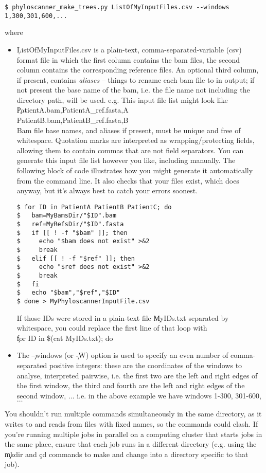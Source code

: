 \begin{verbatim}
$ phyloscanner_make_trees.py ListOfMyInputFiles.csv --windows 1,300,301,600,...
\end{verbatim}
where
\begin{itemize}
\item \c{ListOfMyInputFiles.csv} is a plain-text, comma-separated-variable (csv) format file in which the first column contains the bam files, the second column contains the corresponding reference files.
An optional third column, if present, contains {\it aliases} -- things to rename each bam file to in \pmt output; if not present the base name of the bam, i.e. the file name not including the directory path, will be used.
e.g. This input file list might look like\\
\c{PatientA.bam,PatientA\_ref.fasta,A\\
PatientB.bam,PatientB\_ref.fasta,B}\\
Bam file base names, and aliases if present, must be unique and free of whitespace.
Quotation marks are interpreted as wrapping/protecting fields, allowing them to contain commas that are not field separators.
You can generate this input file list however you like, including manually.
The following block of code illustrates how you might generate it automatically from the command line.
It also checks that your files exist, which \pmt does anyway, but it's always best to catch your errors soonest.
\begin{verbatim}
$ for ID in PatientA PatientB PatientC; do
$   bam=MyBamsDir/"$ID".bam
$   ref=MyRefsDir/"$ID".fasta
$   if [[ ! -f "$bam" ]]; then
$     echo "$bam does not exist" >&2
$     break
$   elif [[ ! -f "$ref" ]]; then
$     echo "$ref does not exist" >&2
$     break
$   fi
$   echo "$bam","$ref","$ID"
$ done > MyPhyloscannerInputFile.csv
\end{verbatim}
If those IDs were stored in a plain-text file \c{MyIDs.txt} separated by whitespace, you could replace the first line of that loop with\\
\c{for ID in \$(cat MyIDs.txt); do}
\item The \c{--windows} (or \c{-W}) option is used to specify an even number of comma-separated positive integers: these are the coordinates of the windows to analyse, interpreted pairwise, i.e. the first two are the left and right edges of the first window, the third and fourth are the left and right edges of the second window, $\ldots$ i.e. in the above example we have windows 1-300, 301-600, $\ldots$
\end{itemize}
You shouldn't run multiple \pmt commands simultaneously in the same directory, as it writes to and reads from files with fixed names, so the commands could clash.
If you're running multiple jobs in parallel on a computing cluster that starts jobs in the same place, ensure that each job runs in a different directory (e.g. using the \c{mkdir} and \c{cd} commands to make and change into a directory specific to that job).

